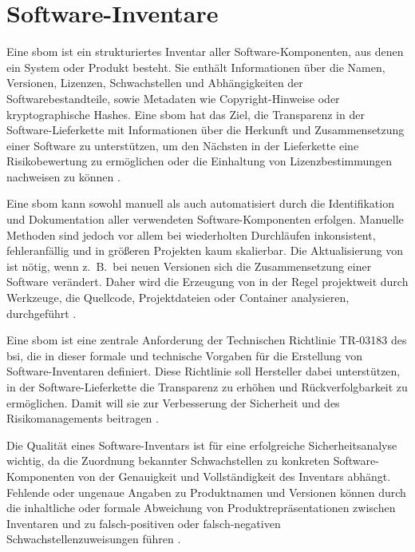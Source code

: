 \section{Software-Inventare}\label{sec:def-inventories}

Eine \acrfull{sbom} ist ein strukturiertes Inventar aller Software-Komponenten, aus denen ein System oder Produkt besteht.
Sie enthält Informationen über die Namen, Versionen, Lizenzen, Schwachstellen und Abhängigkeiten der Softwarebestandteile, sowie Metadaten wie Copyright-Hinweise oder kryptographische Hashes.
Eine \acrshort{sbom} hat das Ziel, die Transparenz in der Software-Lieferkette mit Informationen über die Herkunft und Zusammensetzung einer Software zu unterstützen, um den Nächsten in der Lieferkette eine Risikobewertung zu ermöglichen oder die Einhaltung von Lizenzbestimmungen nachweisen zu können \autocite{Bi_Xia_Xing_Lu_Zhu_2023}.

Eine \acrshort{sbom} kann sowohl manuell als auch automatisiert durch die Identifikation und Dokumentation aller verwendeten Software-Komponenten erfolgen.
Manuelle Methoden sind jedoch vor allem bei wiederholten Durchläufen inkonsistent, fehleranfällig und in größeren Projekten kaum skalierbar.
Die Aktualisierung von  ist nötig, wenn z.\ B.\ bei neuen Versionen sich die Zusammensetzung einer Software verändert.
Daher wird die Erzeugung von  in der Regel projektweit durch Werkzeuge, die Quellcode, Projektdateien oder Container analysieren, durchgeführt \autocite{Bi_Xia_Xing_Lu_Zhu_2023}.

Eine \acrshort{sbom} ist eine zentrale Anforderung der Technischen Richtlinie TR-03183 des \acrfull{bsi}, die in dieser formale und technische Vorgaben für die Erstellung von Software-Inventaren definiert.
Diese Richtlinie soll Hersteller dabei unterstützen, in der Software-Lieferkette die Transparenz zu erhöhen und Rückverfolgbarkeit zu ermöglichen.
Damit will sie zur Verbesserung der Sicherheit und des Risikomanagements beitragen \autocite{BSI_TR03183}.

Die Qualität eines Software-Inventars ist für eine erfolgreiche Sicherheitsanalyse wichtig, da die Zuordnung bekannter Schwachstellen zu konkreten Software-Komponenten von der Genauigkeit und Vollständigkeit des Inventars abhängt.
Fehlende oder ungenaue Angaben zu Produktnamen und Versionen können durch die inhaltliche oder formale Abweichung von Produktrepräsentationen zwischen Inventaren und  zu falsch-positiven oder falsch-negativen Schwachstellenzuweisungen führen \autocite{Idrissi_Sebai_Faroukhi_Mahouachi_2024}.

